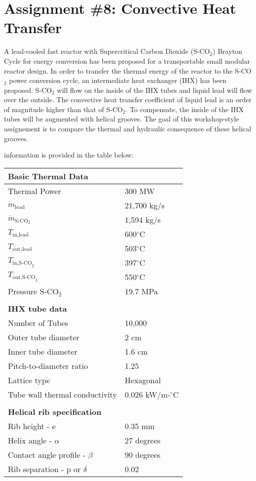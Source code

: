 \chapter{Assignment \#8: Convective Heat Transfer}
\label{ch:ass8}


\begin{fullwidth}
A lead-cooled fast reactor with Supercritical Carbon Dioxide (S-CO$_2$) Brayton Cycle for energy conversion has been proposed for a transportable small modular reactor design.  In order to transfer the thermal energy of the reactor to the S-CO$_2$ power conversion cycle, an intermediate heat exchanger (IHX) has been proposed.  S-CO$_2$ will flow on the inside of the IHX tubes and liquid lead will flow over the outside.  The convective heat transfer coefficient of liquid lead is an order of magnitude higher than that of S-CO$_2$.  To compensate, the inside of the IHX tubes will be augmented with helical grooves.  The goal of this workshop-style assignement is to compare the thermal and hydraulic consequence of these helical grooves.

 information is provided in the table below:

\begin{table}
\begin{tabular}{l | l}
\toprule
\textbf{Basic Thermal Data} & \\
\hline
Thermal Power & 300 MW \\
$\dot{m}_{\text{lead}}$ & 21,700 kg/s \\
$\dot{m}_{\text{S-CO}_2}$ & 1,594 kg/s \\
$T_{\text{in,lead}}$ & 600$^{\circ}$C \\
$T_{\text{out,lead}}$ & 503$^{\circ}$C \\
$T_{\text{in,S-CO}_2}$ & 397$^{\circ}$C \\
$T_{\text{out,S-CO}_2}$ & 550$^{\circ}$C \\
Pressure S-CO$_2$ & 19.7 MPa \\
   & \\
\textbf{IHX tube data} & \\
\hline
Number of Tubes & 10,000 \\
Outer tube diameter & 2 cm \\
Inner tube diameter & 1.6 cm \\
Pitch-to-diameter ratio & 1.25 \\
Lattice type & Hexagonal \\
Tube wall thermal conductivity & 0.026 kW/m-$^{\circ}$C\\
  & \\
\textbf{Helical rib specification} & \\
Rib height - e & 0.35 mm \\
Helix angle - $\alpha$ & 27 degrees \\
Contact angle profile - $\beta$ & 90 degrees \\
Rib separation - p or $\delta$	& 0.02 \\
\bottomrule
\end{tabular}
\end{table}


\end{fullwidth}
